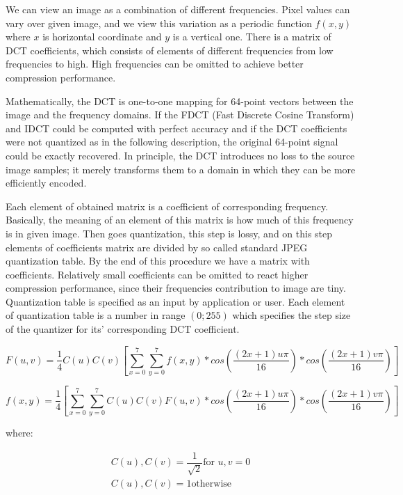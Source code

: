 We can view an image as a combination of different frequencies. Pixel values can vary over given image, and we view this variation as a periodic function $f(x, y)$ where $x$ is horizontal coordinate and $y$ is a vertical one. There is a matrix of DCT coefficients, which consists of elements of different frequencies from low frequencies to high. High frequencies can be omitted to achieve better compression performance.

Mathematically, the DCT is one-to-one mapping for 64-point vectors between the image and the frequency domains. If the FDCT (Fast Discrete Cosine Transform) and IDCT could be computed with perfect accuracy and if the DCT coefficients were not quantized as in the following description, the original 64-point signal could be exactly recovered. In principle, the DCT introduces no loss to the source image samples; it merely transforms them to a domain in which they can be more efficiently encoded.

Each element of obtained matrix is a coefficient of corresponding frequency. Basically, the meaning of an element of this matrix is how much of this frequency is in given image. Then goes quantization, this step is lossy, and on this step elements of coefficients matrix are divided by so called standard JPEG quantization table. By the end of this procedure we have a matrix with coefficients. Relatively small coefficients can be omitted to react higher compression performance, since their frequencies contribution to image are tiny. Quantization table is specified as an input by application or user. Each element of quantization table is a number in range $(0; 255)$ which specifies the step size of the quantizer for its' corresponding DCT coefficient.

\begin{equation}
    \label{eq:00}
    F(u,v)=\dfrac{1}{4}C(u)C(v)[\sum_{x=0}^{7}\sum_{y=0}^{7}{f(x,y)*cos(\dfrac{(2x+1)u\pi}{16})*cos(\dfrac{(2x+1)v\pi}{16})}]
\end{equation}

\begin{equation}
    \label{eq:01}
    f(x,y)=\dfrac{1}{4}[\sum_{x=0}^{7}\sum_{y=0}^{7}{C(u)C(v)F(u,v)*cos(\dfrac{(2x+1)u\pi}{16})*cos(\dfrac{(2x+1)v\pi}{16})}]
\end{equation}

where:

\begin{equation}
    \label{eq:02}
    \begin{split}
        C(u), C(v) = \dfrac{1}{\sqrt{2}} \text{for } u,v=0 \\
        C(u), C(v) = 1 \text{otherwise}
    \end{split}
\end{equation}

